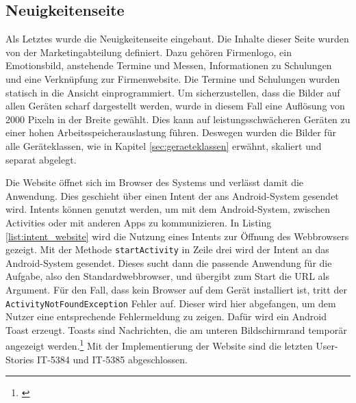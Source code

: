 \FloatBarrier
\subsection{Neuigkeitenseite}

Als Letztes wurde die Neuigkeitenseite eingebaut. Die Inhalte dieser Seite wurden von der Marketingabteilung definiert. Dazu gehören Firmenlogo, ein Emotionsbild, anstehende Termine und Messen, Informationen zu Schulungen und eine Verknüpfung zur Firmenwebsite. Die Termine und Schulungen wurden statisch in die Ansicht einprogrammiert. Um sicherzustellen, dass die Bilder auf allen Geräten scharf dargestellt werden, wurde in diesem Fall eine Auflösung von 2000 Pixeln in der Breite gewählt. Dies kann auf leistungsschwächeren Geräten zu einer hohen Arbeitsspeicherauslastung führen. Deswegen wurden die Bilder für alle Geräteklassen, wie in Kapitel \ref{sec:geraeteklassen} erwähnt, skaliert und separat abgelegt.

Die Website öffnet sich im Browser des Systems und verlässt damit die Anwendung. Dies geschieht über einen Intent der ans Android-System gesendet wird. Intents können genutzt werden, um mit dem Android-System, zwischen Activities oder mit anderen Apps zu kommunizieren. In Listing \ref{list:intent_website} wird die Nutzung eines Intents zur Öffnung des Webbrowsers gezeigt. Mit der Methode \texttt{startActivity} in Zeile drei wird der Intent an das Android-System gesendet. Dieses sucht dann die passende Anwendung für die Aufgabe, also den Standardwebbrowser, und übergibt zum Start die \gls{URL} als Argument. Für den Fall, dass kein Browser auf dem Gerät installiert ist, tritt der \texttt{ActivityNotFoundException} Fehler auf. Dieser wird hier abgefangen, um dem Nutzer eine entsprechende Fehlermeldung zu zeigen. Dafür wird ein Android Toast erzeugt. Toasts sind Nachrichten, die am unteren Bildschirmrand temporär angezeigt werden.\footnote{\cite[Vgl.][]{AndroidToasts2019}} Mit der Implementierung der Website sind die letzten User-Stories IT-5384 und IT-5385 abgeschlossen.

